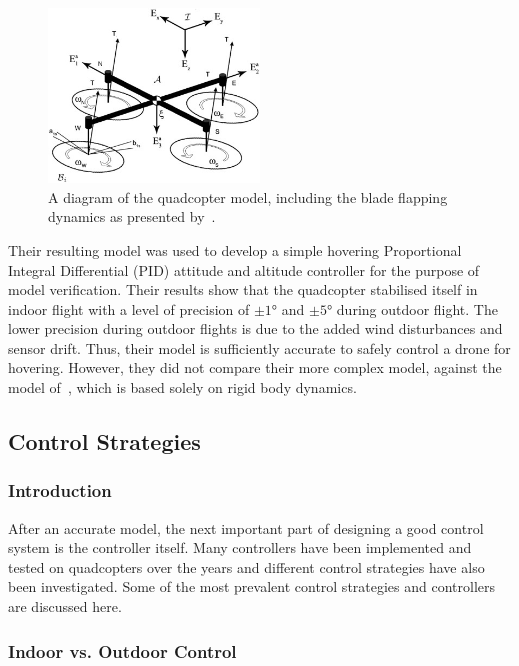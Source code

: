 \begin{figure}
  \centering
  \includegraphics[width=0.5\textwidth]{figures/chapter2/pounds_quad-model.jpg}
  \caption[A diagram of the quadcopter model, including the blade flapping dynamics.]{A diagram of the quadcopter model, including the blade flapping dynamics as presented by~\cite{Pounds2010c}.}
\label{fig:chap2-quad-model}
\end{figure}

Their resulting model was used to develop a simple hovering Proportional Integral Differential (PID) attitude and altitude controller for the purpose of model verification. Their results show that the quadcopter stabilised itself in indoor flight with a level of precision of $\pm\ang{1}$ and $\pm\ang{5}$ during outdoor flight. The lower precision during outdoor flights is due to the added wind disturbances and sensor drift. Thus, their model is sufficiently accurate to safely control a drone for hovering. However, they did not compare their more complex model, against the model of~\citeauthor{hamel2002dynamic}, which is based solely on rigid body dynamics. 

\subsection{Control Strategies}

\subsubsection{Introduction}

After an accurate model, the next important part of designing a good control system is the controller itself. Many controllers have been implemented and tested on quadcopters over the years and different control strategies have also been investigated. Some of the most prevalent control strategies and controllers are discussed here.

\subsubsection{Indoor vs. Outdoor Control}


